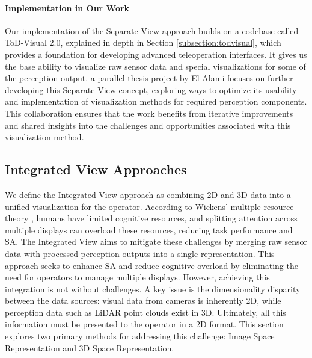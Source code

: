 \paragraph{Implementation in Our Work} Our implementation of the Separate View approach builds on a codebase called ToD-Visual 2.0, explained in depth in Section \ref{subsection:todvisual}, which provides a foundation for developing advanced teleoperation interfaces.
It gives us the base ability to visualize raw sensor data and special visualizations for some of the perception output.
a parallel thesis project by El Alami \cite{yassinethesis} focuses on further developing this Separate View concept, exploring ways to optimize its usability and
implementation of visualization methods for required perception components. This collaboration ensures that the work benefits from iterative improvements and shared insights into the challenges and
opportunities associated with this visualization method.

\subsection{Integrated View Approaches}\label{section:integratedview}
We define the Integrated View approach as combining 2D and 3D data into a
unified visualization for the operator. According to Wickens' multiple resource theory \cite{wickens2008multiple},
humans have limited cognitive resources, and splitting attention across multiple displays can overload these resources,
reducing task performance and \ac{SA}. The Integrated View aims to mitigate these challenges by
merging raw sensor data with processed perception outputs into a single representation. This approach seeks to enhance
\ac{SA} and reduce cognitive overload by eliminating the need for operators to manage multiple displays.
However, achieving this integration is not without challenges. A key issue is the dimensionality disparity between the data sources:
visual data from cameras is inherently 2D, while perception data such as \ac{LiDAR} point clouds exist in 3D.
Ultimately, all this information must be presented to the operator in a 2D format.
This section explores two primary methods for addressing this challenge:
Image Space Representation and 3D Space Representation.

